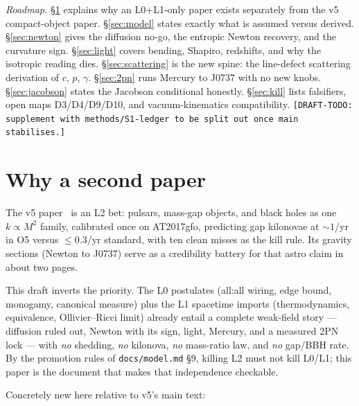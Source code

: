 \documentclass[11pt]{article}
\begin{document}
\noindent\textit{Roadmap.} \S\ref{sec:why} explains why an L0+L1-only paper exists separately from the v5 compact-object paper. \S\ref{sec:model} states exactly what is assumed versus derived. \S\ref{sec:newton} gives the diffusion no-go, the entropic Newton recovery, and the curvature sign. \S\ref{sec:light} covers bending, Shapiro, redshifts, and why the isotropic reading dies. \S\ref{sec:scattering} is the new spine: the line-defect scattering derivation of $c$, $p$, $\gamma$. \S\ref{sec:2pn} runs Mercury to J0737 with no new knobs. \S\ref{sec:jacobson} states the Jacobson conditional honestly. \S\ref{sec:kill} lists falsifiers, open maps D3/D4/D9/D10, and vacuum-kinematics compatibility. \texttt{[DRAFT-TODO: supplement with methods/S1-ledger to be split out once main stabilises.]}

\section{Why a second paper}
\label{sec:why}

The v5 paper~\cite{v5draft} is an L2 bet: pulsars, mass-gap objects, and black holes as one $k \propto M^2$ family, calibrated once on AT2017gfo, predicting gap kilonovae at $\sim 1$/yr in O5 versus $\le 0.3$/yr standard, with ten clean misses as the kill rule. Its gravity sections (Newton to J0737) serve as a credibility battery for that astro claim in about two pages.

This draft inverts the priority. The L0 postulates (all:all wiring, edge bound, monogamy, canonical measure) plus the L1 spacetime imports (thermodynamics, equivalence, Ollivier--Ricci limit) already entail a complete weak-field story --- diffusion ruled out, Newton with its sign, light, Mercury, and a measured 2PN lock --- with \emph{no} shedding, \emph{no} kilonova, \emph{no} mass-ratio law, and \emph{no} gap/BBH rate. By the promotion rules of \texttt{docs/model.md} \S9, killing L2 must not kill L0/L1; this paper is the document that makes that independence checkable.

Concretely new here relative to v5's main text:
\end{document}
